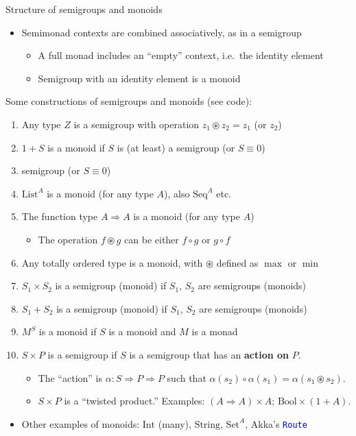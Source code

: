 \documentclass[english]{beamer}
\begin{document}
\begin{frame}{Structure of semigroups and monoids}

\begin{itemize}
\item Semimonad contexts are combined associatively, as in a semigroup
\begin{itemize}
\item A full monad includes an ``empty'' context, i.e.\ the identity
element
\item Semigroup with an identity element is a monoid
\end{itemize}
\end{itemize}
Some constructions of semigroups and monoids (see code):
\begin{enumerate}
\item Any type $Z$ is a semigroup with operation $z_{1}\circledast z_{2}=z_{1}$
(or $z_{2}$)
\item $1+S$ is a monoid if $S$ is (at least) a semigroup (or $S\equiv0$)
\item semigroup (or $S\equiv0$)
\item $\text{List}^{A}$ is a monoid (for any type $A$), also $\text{Seq}^{A}$
etc.
\item The function type $A\Rightarrow A$ is a monoid (for any type $A$)
\begin{itemize}
\item The operation $f\circledast g$ can be either $f\circ g$ or $g\circ f$
\end{itemize}
\item Any totally ordered type is a monoid, with $\circledast$ defined
as $\max$ or $\min$
\item $S_{1}\times S_{2}$ is a semigroup (monoid) if $S_{1}$, $S_{2}$
are semigroups (monoids)
\item $S_{1}+S_{2}$ is a semigroup (monoid) if $S_{1}$, $S_{2}$ are semigroups
(monoids)
\item $M^{S}$ is a monoid if $S$ is a monoid and $M$ is a monad
\item $S\times P$ is a semigroup if $S$ is a semigroup that has an \textbf{action
on} $P$.
\begin{itemize}
\item The ``action'' is $\alpha:S\Rightarrow P\Rightarrow P$ such that
$\alpha(s_{2})\circ\alpha(s_{1})=\alpha(s_{1}\circledast s_{2})$.
\item $S\times P$ is a ``twisted product.'' Examples: $\left(A\Rightarrow A\right)\times A$;
$\text{Bool}\times\left(1+A\right)$.
\end{itemize}
\end{enumerate}
\begin{itemize}
\item Other examples of monoids: $\text{Int}$ (many), $\text{String}$,
$\text{Set}^{A}$, Akka's \texttt{\textcolor{blue}{\footnotesize{}Route}} 
\end{itemize}
\end{frame}
\end{document}
